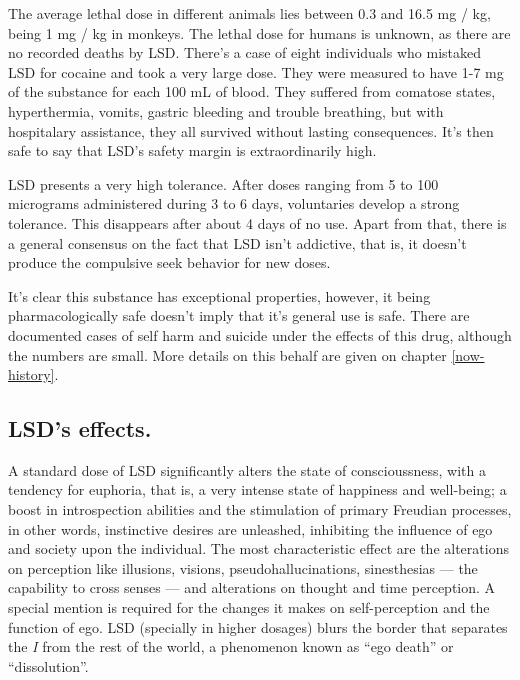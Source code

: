 The average lethal dose in different animals lies between 0.3 and 16.5 mg / kg, being 1 mg / kg in monkeys. The lethal dose for humans is unknown, as there are no recorded deaths by LSD. There's a case of eight individuals who mistaked LSD for cocaine and took a very large dose. They were measured to have 1-7 mg of the substance for each 100 mL of blood. They suffered from comatose states, hyperthermia, vomits, gastric bleeding and trouble breathing, but with hospitalary assistance, they all survived without lasting consequences. It's then safe to say that LSD's safety margin is extraordinarily high.

LSD presents a very high tolerance. After doses ranging from 5 to 100 micrograms administered during 3 to 6 days, voluntaries develop a strong tolerance. This disappears after about 4 days of no use. Apart from that, there is a general consensus on the fact that LSD isn't addictive, that is, it doesn't produce the compulsive seek behavior for new doses.

It's clear this substance has exceptional properties, however, it being pharmacologically safe doesn't imply that it's general use is safe. There are documented cases of self harm and suicide under the effects of this drug, although the numbers are small. More details on this behalf are given on chapter \ref{now-history}.

\newpage

\subsection{LSD's effects.}

A standard dose of LSD significantly alters the state of conscioussness, with a tendency for euphoria, that is, a very intense state of happiness and well-being; a boost in introspection abilities and the stimulation of primary Freudian processes, in other words, instinctive desires are unleashed, inhibiting the influence of ego and society upon the individual. The most characteristic effect are the alterations on perception like illusions, visions, pseudohallucinations, sinesthesias --- the capability to cross senses --- and alterations on thought and time perception. A special mention is required for the changes it makes on self-perception and the function of ego. LSD (specially in higher dosages) blurs the border that separates the \textit{I} from the rest of the world, a phenomenon known as \enquote{ego death} or \enquote{dissolution}.

